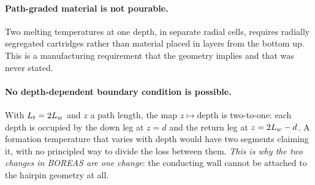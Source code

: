 \paragraph{Path-graded material is not pourable.} Two melting temperatures at
one depth, in separate radial cells, requires radially segregated cartridges
rather than material placed in layers from the bottom up. This is a
manufacturing requirement that the geometry implies and that was never stated.

\paragraph{No depth-dependent boundary condition is possible.} With
$L_t = 2L_{w}$ and $z$ a path length, the map $z \mapsto \text{depth}$ is
two-to-one: each depth is occupied by the down leg at $z = d$ and the return
leg at $z = 2L_{w} - d$. A formation temperature that varies with depth would
have two segments claiming it, with no principled way to divide the loss
between them. \emph{This is why the two changes in BOREAS are one change}: the
conducting wall cannot be attached to the hairpin geometry at all.

